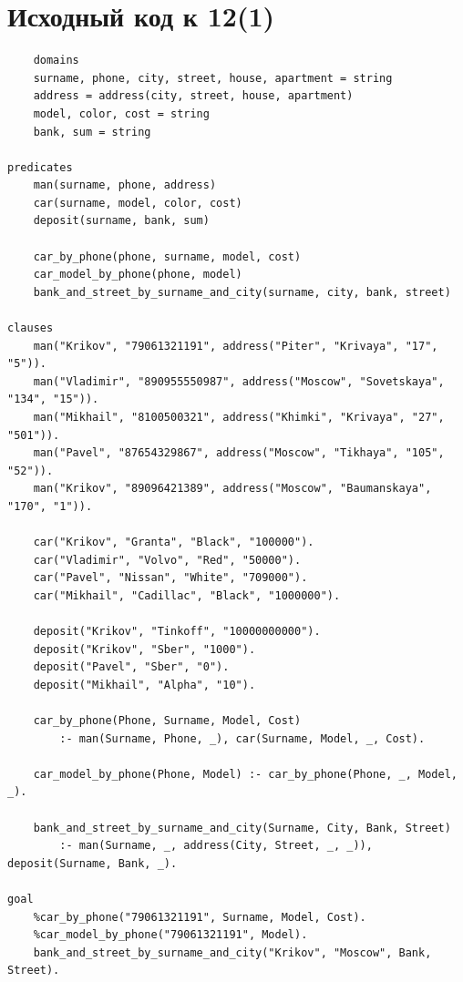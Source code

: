 \documentclass[12pt]{report}
\begin{document}
\section*{Исходный код к 12(1)}
\begin{lstlisting}
	domains
	surname, phone, city, street, house, apartment = string
	address = address(city, street, house, apartment)
	model, color, cost = string
	bank, sum = string

predicates
	man(surname, phone, address)
	car(surname, model, color, cost)
	deposit(surname, bank, sum)
	
	car_by_phone(phone, surname, model, cost)
	car_model_by_phone(phone, model)
	bank_and_street_by_surname_and_city(surname, city, bank, street)

clauses	
	man("Krikov", "79061321191", address("Piter", "Krivaya", "17", "5")).
	man("Vladimir", "890955550987", address("Moscow", "Sovetskaya", "134", "15")).
	man("Mikhail", "8100500321", address("Khimki", "Krivaya", "27", "501")).
	man("Pavel", "87654329867", address("Moscow", "Tikhaya", "105", "52")).
	man("Krikov", "89096421389", address("Moscow", "Baumanskaya", "170", "1")).
	
	car("Krikov", "Granta", "Black", "100000").
	car("Vladimir", "Volvo", "Red", "50000").
	car("Pavel", "Nissan", "White", "709000").
	car("Mikhail", "Cadillac", "Black", "1000000").
	
	deposit("Krikov", "Tinkoff", "10000000000").
	deposit("Krikov", "Sber", "1000").
	deposit("Pavel", "Sber", "0").
	deposit("Mikhail", "Alpha", "10").
	
	car_by_phone(Phone, Surname, Model, Cost)
		:- man(Surname, Phone, _), car(Surname, Model, _, Cost).
	
	car_model_by_phone(Phone, Model) :- car_by_phone(Phone, _, Model, _).
	
	bank_and_street_by_surname_and_city(Surname, City, Bank, Street)
		:- man(Surname, _, address(City, Street, _, _)), deposit(Surname, Bank, _).

goal
	%car_by_phone("79061321191", Surname, Model, Cost).
	%car_model_by_phone("79061321191", Model).
	bank_and_street_by_surname_and_city("Krikov", "Moscow", Bank, Street).
\end{lstlisting}
\end{document}

